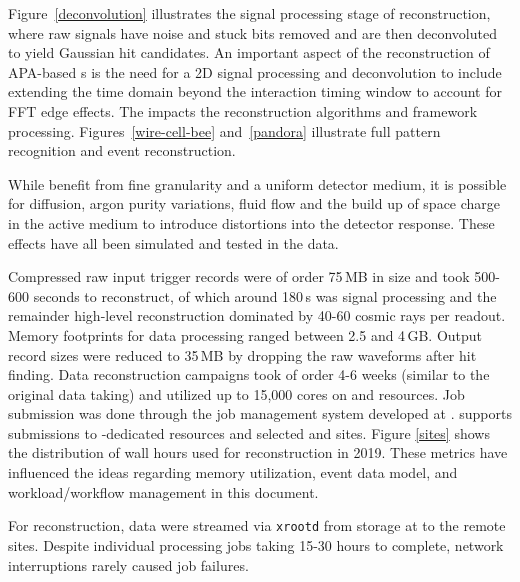 \documentclass[../main-v1.tex]{subfiles}
\begin{document}
Figure~\ref{deconvolution} illustrates the signal processing stage of reconstruction, where raw  signals have noise and stuck bits removed and are then deconvoluted to yield Gaussian hit candidates. An important aspect of the reconstruction of APA-based s is the need for a 2D signal processing and deconvolution to include extending the time domain beyond the interaction timing window to account for FFT edge effects. The impacts the reconstruction algorithms and framework processing. Figures~\ref{wire-cell-bee} and~\ref{pandora} illustrate full pattern recognition and event reconstruction. 

While  benefit from fine granularity and a uniform detector medium, it is possible for diffusion, argon purity variations, fluid flow and the build up of space charge in the active medium %
to introduce distortions into the detector response.  These effects have all been simulated and tested in the  data. 

Compressed raw input trigger records were of order 75\,MB in size and took 500-600 seconds to reconstruct, of which around 180\,s was signal processing and the remainder high-level reconstruction dominated by 40-60 cosmic rays per readout.  Memory footprints for data processing ranged between 2.5 and 4\,GB.  Output   record sizes were reduced to 35\,MB by dropping the raw waveforms after hit finding.   Data reconstruction campaigns took of order 4-6 weeks (similar to the original data taking) and utilized up to 15,000 cores on  and  resources.  Job submission was done through the \cite{poms} job management system developed at .  supports submissions to -dedicated resources and selected  and  sites.  Figure \ref{sites} shows the distribution of wall hours used for reconstruction in 2019.
These metrics have influenced the ideas regarding memory utilization, event data model, and workload/workflow management in this document.

For reconstruction, data were streamed via {\tt xrootd}\cite{Behrmann:2011zz} from  storage at  to the remote sites. Despite individual processing jobs taking 15-30 hours to complete, network interruptions rarely caused job failures. 
\end{document}
